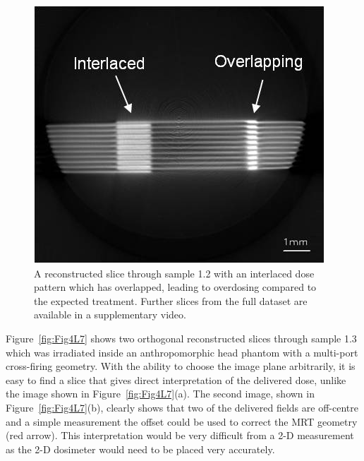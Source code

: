 	\begin{figure}
		\centering
		\includegraphics[width=0.7\linewidth]{mrt_img/mrt_Fig3}
		\caption{A reconstructed slice through sample 1.2 with an interlaced dose pattern which has overlapped, leading to overdosing compared to the expected treatment. Further slices from the full dataset are available in a supplementary video.}
		\label{fig:Fig3S9}
	\end{figure}
	
	
	Figure~\ref{fig:Fig4L7} shows two orthogonal reconstructed slices through sample 1.3 which was irradiated inside an anthropomorphic head phantom with a multi-port cross-firing geometry. With the ability to choose the image plane arbitrarily, it is easy to find a slice that gives direct interpretation of the delivered dose, unlike the image shown in Figure~\ref{fig:Fig4L7}(a). The second image, shown in Figure~\ref{fig:Fig4L7}(b), clearly shows that two of the delivered fields are off-centre and a simple measurement the offset could be used to correct the MRT geometry (red arrow). This interpretation would be very difficult from a 2-D measurement as the 2-D dosimeter would need to be placed very accurately. 
	
